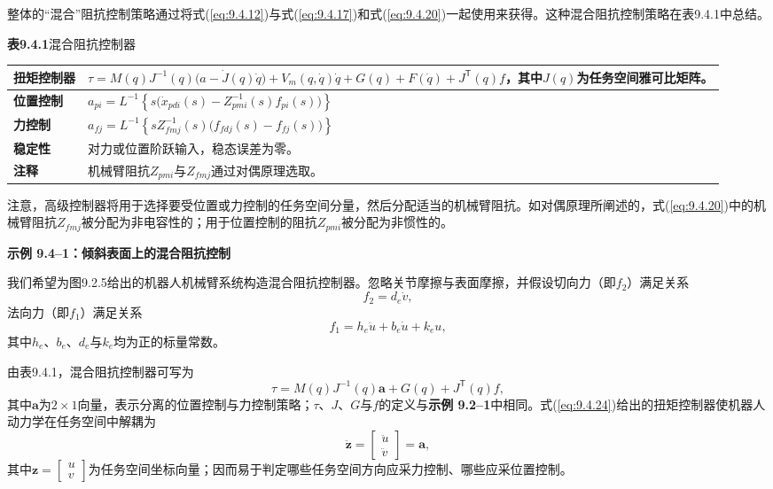 \documentclass[12pt,a4paper]{ctexart}
\begin{document}
整体的``混合''阻抗控制策略通过将式(\ref{eq:9.4.12})与式(\ref{eq:9.4.17})和式(\ref{eq:9.4.20})一起使用来获得。这种混合阻抗控制策略在表9.4.1中总结。

\textbf{表9.4.1}\quad 混合阻抗控制器

\begin{center}
\small
\begin{tabular}{|l|p{11.2cm}|}
\hline
\textbf{扭矩控制器} & $\displaystyle \tau = M(q)J^{-1}(q)\bigl(a - \dot{J}(q)\dot{q}\bigr) + V_m(q,\dot{q})\dot{q} + G(q) + F(\dot{q}) + J^{\mathsf T}(q)f$，其中$J(q)$为任务空间雅可比矩阵。 \\
\hline
\textbf{位置控制} & $\displaystyle a_{pi} = L^{-1}\!\left\{ s\bigl(\dot{x}_{pdi}(s) - Z_{pmi}^{-1}(s)f_{pi}(s)\bigr) \right\}$ \\
\hline
\textbf{力控制} & $\displaystyle a_{fj} = L^{-1}\!\left\{ s Z_{fmj}^{-1}(s)\bigl(f_{fdj}(s) - f_{fj}(s)\bigr) \right\}$ \\
\hline
\textbf{稳定性} & 对力或位置阶跃输入，稳态误差为零。 \\
\hline
\textbf{注释} & 机械臂阻抗$Z_{pmi}$与$Z_{fmj}$通过对偶原理选取。 \\
\hline
\end{tabular}
\end{center}

注意，高级控制器将用于选择要受位置或力控制的任务空间分量，然后分配适当的机械臂阻抗。如对偶原理所阐述的，式(\ref{eq:9.4.20})中的机械臂阻抗$Z_{fmj}$被分配为非电容性的；用于位置控制的阻抗$Z_{pmi}$被分配为非惯性的。

\textbf{示例 9.4--1：倾斜表面上的混合阻抗控制}

我们希望为图9.2.5给出的机器人机械臂系统构造混合阻抗控制器。忽略关节摩擦与表面摩擦，并假设切向力（即$f_2$）满足关系
\begin{equation}\label{eq:9.4.22}
f_2 = d_e \dot{v},
\end{equation}
法向力（即$f_1$）满足关系
\begin{equation}\label{eq:9.4.23}
f_1 = h_e \ddot{u} + b_e \dot{u} + k_e u,
\end{equation}
其中$h_e$、$b_e$、$d_e$与$k_e$均为正的标量常数。

由表9.4.1，混合阻抗控制器可写为
\begin{equation}\label{eq:9.4.24}
\tau = M(q)J^{-1}(q)\mathbf{a} + G(q) + J^{\mathsf T}(q)f,
\end{equation}
其中$\mathbf{a}$为$2\times 1$向量，表示分离的位置控制与力控制策略；$\tau$、$J$、$G$与$f$的定义与\textbf{示例 9.2--1}中相同。式(\ref{eq:9.4.24})给出的扭矩控制器使机器人动力学在任务空间中解耦为
\begin{equation}\label{eq:9.4.25}
\ddot{\mathbf{z}} = \begin{bmatrix} \ddot{u} \\ \ddot{v} \end{bmatrix} = \mathbf{a},
\end{equation}
其中$\mathbf{z}=\begin{bmatrix} u \\ v \end{bmatrix}$为任务空间坐标向量；因而易于判定哪些任务空间方向应采力控制、哪些应采位置控制。
\end{document}
